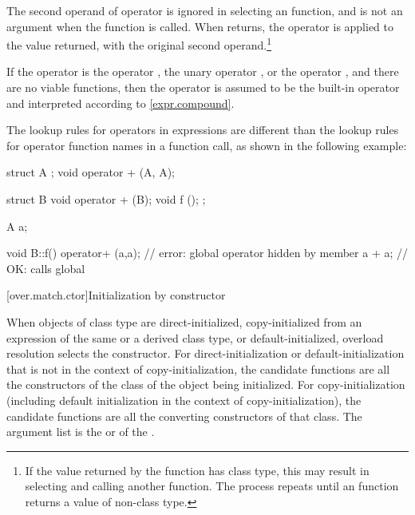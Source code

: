 \pnum
The second operand of operator
\tcode{->}
is ignored in selecting an
function, and is not an argument when the
function is called.
When
returns, the operator
\tcode{->}
is applied to the value returned, with the original second
operand.\footnote{If the value returned by the
function has class type, this may result in selecting and calling another
function.
The process repeats until an
function returns a value of non-class type.}

\pnum
If the operator is the operator
\tcode{,},
the unary operator
\tcode{\&},
or the operator
\tcode{->},
and there are no viable functions, then the operator is
assumed to be the built-in operator and interpreted according to
\ref{expr.compound}.

\pnum
\begin{note}
The lookup rules for operators in expressions are different than
the lookup
rules for operator function names in a function call, as shown in the following
example:

\begin{codeblock}
struct A { };
void operator + (A, A);

struct B {
  void operator + (B);
  void f ();
};

A a;

void B::f() {
  operator+ (a,a);              // error: global operator hidden by member
  a + a;                        // OK: calls global 
}
\end{codeblock}
\end{note}

[over.match.ctor]{Initialization by constructor}%

\pnum
When objects of class type are direct-initialized,
copy-initialized from an expression of the same or a
derived class type,
or default-initialized,
overload resolution selects the constructor.
For direct-initialization or default-initialization
that is not in the context of copy-initialization, the
candidate functions are
all the constructors of the class of the object being
initialized.
For copy-initialization (including default initialization
in the context of copy-initialization), the candidate functions are all
the converting constructors of that
class.
The argument list is the
 or 
of the .

